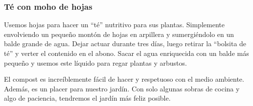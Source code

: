 \documentclass[../main.tex]{subfiles}
\begin{document}
\subsubsection{Té con moho de hojas}

\begin{recuadroV}
    Usemos hojas para hacer un \enquote{té} nutritivo para sus plantas. Simplemente envolviendo un pequeño montón de hojas en arpillera y sumergiéndolo en un balde grande de agua. Dejar actuar durante tres días, luego retirar la \enquote{bolsita de té} y verter el contenido en el abono. Sacar el agua enriquecida con un balde más pequeño y usemos este líquido para regar plantas y arbustos.
\end{recuadroV}

El compost es increíblemente fácil de hacer y respetuoso con el medio ambiente. Además, es un placer para nuestro jardín. Con solo algunas sobras de cocina y algo de paciencia, tendremos el jardín más feliz posible.

\pagebreak
\end{document}
